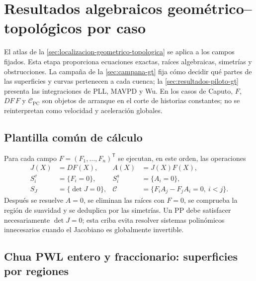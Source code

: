 \section{Resultados algebraicos geométrico--topológicos por caso}
\label{sec:resultados-gt-casos}

El atlas de la \cref{sec:localizacion-geometrico-topologica} se aplica a los
campos fijados. Esta etapa proporciona ecuaciones exactas, raíces algebraicas,
simetrías y obstrucciones. La campaña de la \cref{sec:campana-gt} fija cómo
decidir qué partes de las superficies y curvas pertenecen a cada cuenca; la
\cref{sec:resultados-piloto-gt} presenta las integraciones de PLL,
MAVPD y Wu. En los casos de Caputo, $F$, $DF\,F$ y
$\mathcal C_{\mathrm{PC}}$ son objetos de arranque en el corte de historias
constantes; no se reinterpretan como velocidad y aceleración globales.

\subsection{Plantilla común de cálculo}

Para cada campo $F=(F_1,\ldots,F_n)^{\mathsf T}$ se ejecutan, en este orden,
las operaciones
\begin{align}
 J(X)&=DF(X), & A(X)&=J(X)F(X),
 \label{casegt:eq:JA}\\
 S_i^v&=\{F_i=0\}, & S_i^a&=\{A_i=0\},
 \label{casegt:eq:surfaces}\\
 S_J&=\{\det J=0\}, &
 \mathcal C&=\{F_iA_j-F_jA_i=0,\ i<j\}.
 \label{casegt:eq:singular-connecting}
\end{align}
Después se resuelve $A=0$, se eliminan las raíces con $F=0$, se comprueba la
región de suavidad y se deduplica por las simetrías. Un PP debe satisfacer
necesariamente $\det J=0$; esta criba evita resolver sistemas polinómicos
innecesarios cuando el Jacobiano es globalmente invertible.

\subsection{Chua PWL entero y fraccionario: superficies por regiones}
\label{subsec:casegt-chua-pwl}

